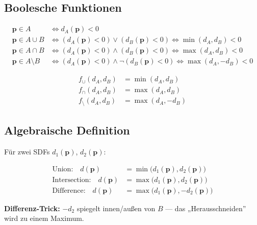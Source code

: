 \documentclass[
  ngerman,
]{article}
\begin{document}
\subsection{Boolesche Funktionen}\label{boolesche-funktionen}

{\small

\[
\begin{aligned}
\mathbf p \in A
  &\Longleftrightarrow d_A(\mathbf p) < 0 \\[0.45em]
\mathbf p \in A \cup B
  &\Longleftrightarrow (d_A(\mathbf p)<0)\lor(d_B(\mathbf p)<0)
   \Longleftrightarrow \min(d_A,d_B)<0 \\[0.45em]
\mathbf p \in A \cap B
  &\Longleftrightarrow (d_A(\mathbf p)<0)\land(d_B(\mathbf p)<0)
   \Longleftrightarrow \max(d_A,d_B)<0 \\[0.45em]
\mathbf p \in A \setminus B
  &\Longleftrightarrow (d_A(\mathbf p)<0)\land\neg(d_B(\mathbf p)<0)
   \Longleftrightarrow \max(d_A,-d_B)<0
\end{aligned}
\]

\[
\begin{aligned}
f_{\cup}(d_A,d_B) &= \min(d_A,d_B) \\
f_{\cap}(d_A,d_B) &= \max(d_A,d_B) \\
f_{\setminus}(d_A,d_B) &= \max(d_A,-d_B)
\end{aligned}
\]

}

\subsection{Algebraische Definition}\label{algebraische-definition}

Für zwei SDFs \(d_1(\mathbf{p})\), \(d_2(\mathbf{p})\):

\begin{align*}
\text{Union:}        \quad d(\mathbf{p}) &= \min\bigl(d_1(\mathbf{p}), d_2(\mathbf{p})\bigr) \\
\text{Intersection:}\quad d(\mathbf{p}) &= \max\bigl(d_1(\mathbf{p}), d_2(\mathbf{p})\bigr) \\
\text{Difference:}   \quad d(\mathbf{p}) &= \max\bigl(d_1(\mathbf{p}), -d_2(\mathbf{p})\bigr)
\end{align*}

\vspace{0.3em}

\textbf{Differenz-Trick:} \(-d_2\) spiegelt innen/außen von \(B\) ---
das „Herausschneiden'' wird zu einem Maximum.
\end{document}
